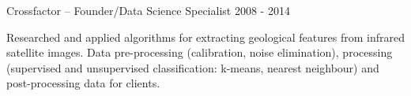 \begin{cventries}
    \cventry
    {Crossfactor – Founder/Data Science Specialist} %
    {} %
    {} %
    {2008 - 2014} %
    {
      \begin{cvitems} %
        \item {Researched and applied algorithms for extracting geological features from infrared satellite images. Data pre-processing (calibration, noise elimination), processing (supervised and unsupervised classification: k-means, nearest neighbour) and post-processing data for clients.}
      \end{cvitems}
    }


\end{cventries}
